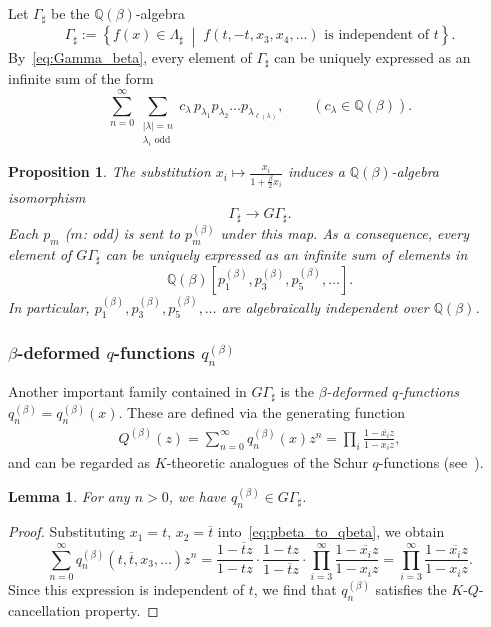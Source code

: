 \documentclass[dvipdfmx]{amsart}
\newtheorem{lemma}[thm]{Lemma}
\newtheorem{prop}[thm]{Proposition}
\theoremstyle{definition}
\theoremstyle{remark}
\begin{document}
Let $\Gamma_\sharp$ be the \( \mathbb{Q}(\beta) \)-algebra
\[
\Gamma_\sharp := \left\{ f(x) \in \Lambda_\sharp \;\middle|\; f(t, -t, x_3, x_4, \dots) \text{ is independent of } t \right\}.
\]
By~\eqref{eq:Gamma_beta}, every element of \( \Gamma_\sharp \) can be uniquely expressed as an infinite sum of the form
\[
\sum_{n=0}^\infty \sum_{\substack{|\lambda| = n \\ \lambda_i \text{ odd}}} 
c_\lambda\, p_{\lambda_1} p_{\lambda_2} \dots p_{\lambda_{\ell(\lambda)}}, \qquad (c_\lambda \in \mathbb{Q}(\beta)).
\]
\begin{prop}\label{cor:p_isbasis_ofG}
The substitution \( x_i \mapsto \frac{x_i}{1 + \frac{\beta}{2} x_i} \) induces a \( \mathbb{Q}(\beta) \)-algebra isomorphism
\[
\Gamma_\sharp \to G\Gamma_\sharp.
\]
Each \( p_m \) (\( m \): odd) is sent to \( p_m^{(\beta)} \) under this map.
As a consequence, every element of \( G\Gamma_\sharp \) can be uniquely expressed as an infinite sum of elements in
\[
\mathbb{Q}(\beta)[p_1^{(\beta)}, p_3^{(\beta)}, p_5^{(\beta)}, \dots].
\]
In particular, \( p_1^{(\beta)}, p_3^{(\beta)}, p_5^{(\beta)}, \dots \) are algebraically independent over \( \mathbb{Q}(\beta) \).
\end{prop}

\subsubsection{\( \beta \)-deformed \( q \)-functions \( q_n^{(\beta)} \)}

Another important family contained in \( G\Gamma_\sharp \) is the \textit{\( \beta \)-deformed \( q \)-functions} \( q_n^{(\beta)} = q_n^{(\beta)}(x) \). These are defined via the generating function
\begin{equation}\label{eq:pbeta_to_qbeta}
\begin{aligned}
Q^{(\beta)}(z) = \sum_{n=0}^\infty q_n^{(\beta)}(x) z^n 
= \prod_i \frac{1 - \overline{x_i} z}{1 - x_i z},
\end{aligned}
\end{equation}
and can be regarded as \( K \)-theoretic analogues of the Schur \( q \)-functions (see~\cite[\S III-8]{macbook}).

\begin{lemma}
For any \( n>0 \), we have \( q_n^{(\beta)} \in G\Gamma_\sharp \).
\end{lemma}

\begin{proof}
Substituting \( x_1 = t \), \( x_2 = \overline{t} \) into~\eqref{eq:pbeta_to_qbeta}, we obtain
\[
\sum_{n=0}^\infty q_n^{(\beta)}(t, \overline{t}, x_3, \dots) z^n
= \frac{1 - \overline{t} z}{1 - t z} \cdot \frac{1 - t z}{1 - \overline{t} z} \cdot 
\prod_{i=3}^\infty \frac{1 - \overline{x_i} z}{1 - x_i z}
= \prod_{i=3}^\infty \frac{1 - \overline{x_i} z}{1 - x_i z}.
\]
Since this expression is independent of \( t \), we find that \( q_n^{(\beta)} \) satisfies the \( K \)-\( Q \)-cancellation property.
\end{proof}
\end{document}
